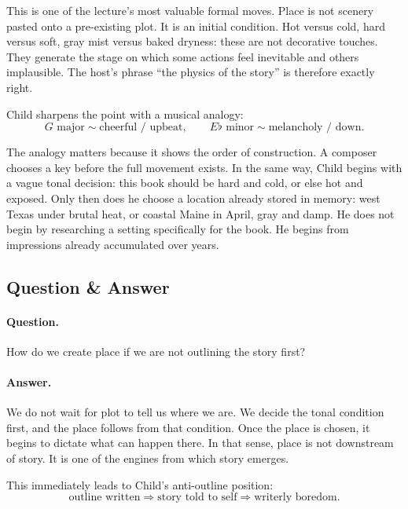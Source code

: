 This is one of the lecture's most valuable formal moves. Place is not scenery pasted onto a pre-existing plot. It is an initial condition. Hot versus cold, hard versus soft, gray mist versus baked dryness: these are not decorative touches. They generate the stage on which some actions feel inevitable and others implausible. The host's phrase ``the physics of the story'' is therefore exactly right.

Child sharpens the point with a musical analogy:
\begin{equation}
G\text{ major} \sim \text{cheerful / upbeat}, \qquad
E\flat \text{ minor} \sim \text{melancholy / down}.
\end{equation}

The analogy matters because it shows the order of construction. A composer chooses a key before the full movement exists. In the same way, Child begins with a vague tonal decision: this book should be hard and cold, or else hot and exposed. Only then does he choose a location already stored in memory: west Texas under brutal heat, or coastal Maine in April, gray and damp. He does not begin by researching a setting specifically for the book. He begins from impressions already accumulated over years.

\subsection{Question \& Answer}

\paragraph{Question.} How do we create place if we are not outlining the story first?

\paragraph{Answer.} We do not wait for plot to tell us where we are. We decide the tonal condition first, and the place follows from that condition. Once the place is chosen, it begins to dictate what can happen there. In that sense, place is not downstream of story. It is one of the engines from which story emerges.

This immediately leads to Child's anti-outline position:
\begin{equation}
\text{outline written} \Longrightarrow \text{story told to self} \Longrightarrow \text{writerly boredom}.
\end{equation}

